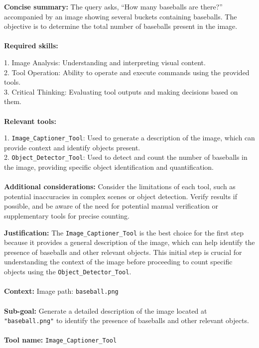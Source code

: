 \begin{plannerbox}

\textbf{Concise summary:}
The query asks, ``How many baseballs are there?'' accompanied by an image showing several buckets containing baseballs. The objective is to determine the total number of baseballs present in the image.
\\\\
\textbf{Required skills:}

1. Image Analysis: Understanding and interpreting visual content. \\
2. Tool Operation: Ability to operate and execute commands using the provided tools. \\
3. Critical Thinking: Evaluating tool outputs and making decisions based on them.
\\\\
\textbf{Relevant tools:}

1. \texttt{Image\_Captioner\_Tool}: Used to generate a description of the image, which can provide context and identify objects present. \\
2. \texttt{Object\_Detector\_Tool}: Used to detect and count the number of baseballs in the image, providing specific object identification and quantification.
\\\\
\textbf{Additional considerations:}
Consider the limitations of each tool, such as potential inaccuracies in complex scenes or object detection. Verify results if possible, and be aware of the need for potential manual verification or supplementary tools for precise counting.
\end{plannerbox}


\begin{plannerbox}

\textbf{Justification:}
The \texttt{Image\_Captioner\_Tool} is the best choice for the first step because it provides a general description of the image, which can help identify the presence of baseballs and other relevant objects. This initial step is crucial for understanding the context of the image before proceeding to count specific objects using the \texttt{Object\_Detector\_Tool}.
\\\\
\textbf{Context:}
Image path: \texttt{baseball.png}
\\\\
\textbf{Sub-goal:}
Generate a detailed description of the image located at \texttt{"baseball.png"} to identify the presence of baseballs and other relevant objects.
\\\\
\textbf{Tool name:} \texttt{Image\_Captioner\_Tool}
\end{plannerbox}



